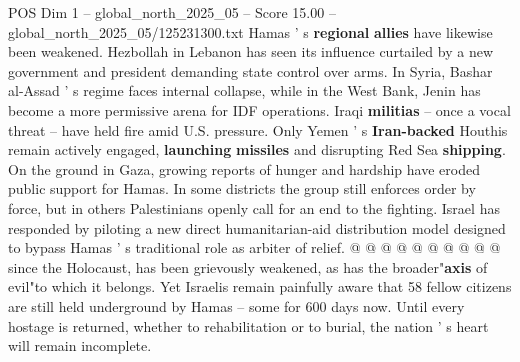 \begin{textsample}{POS Dim 1 – global\_north\_2025\_05 – Score 15.00 – global\_north\_2025\_05/125231300.txt}
Hamas ' s \textbf{regional} \textbf{allies} have likewise been weakened.
Hezbollah in Lebanon has seen its influence curtailed by a new government and president demanding state control over arms.
In Syria, Bashar al-Assad ' s regime faces internal collapse, while in the West Bank, Jenin has become a more permissive arena for IDF operations.
Iraqi \textbf{militias} -- once a vocal threat -- have held fire amid U.S. pressure.
Only Yemen ' s \textbf{Iran-backed} Houthis remain actively engaged, \textbf{launching} \textbf{missiles} and disrupting Red Sea \textbf{shipping}.
On the ground in Gaza, growing reports of hunger and hardship have eroded public support for Hamas.
In some districts the group still enforces order by force, but in others Palestinians openly call for an end to the fighting.
Israel has responded by piloting a new direct humanitarian-aid distribution model designed to bypass Hamas ' s traditional role as arbiter of relief. @ @ @ @ @ @ @ @ @ @ since the Holocaust, has been grievously weakened, as has the broader"\textbf{axis} of evil"to which it belongs.
Yet Israelis remain painfully aware that 58 fellow citizens are still held underground by Hamas -- some for 600 days now.
Until every hostage is returned, whether to rehabilitation or to burial, the nation ' s heart will remain incomplete.

\end{textsample}
